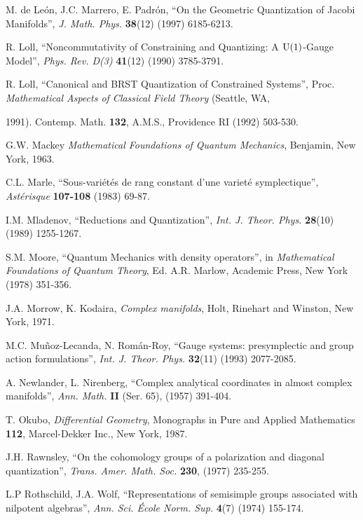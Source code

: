 \documentclass[12pt]{article}
\begin{document}
\begin{thebibliography}{55}
{\sc M. de Le\'on, J.C. Marrero, E. Padr\'on},
``On the Geometric Quantization of Jacobi Manifolds'',
{\it J. Math. Phys.} {\bf 38}(12) (1997) 6185-6213.

{\sc R. Loll},
``Noncommutativity of Constraining and Quantizing: A ${\rm U}(1)$-Gauge
Model'',
{\it Phys. Rev. D(3)} {\bf 41}(12) (1990) 3785-3791.

{\sc R. Loll},
``Canonical and BRST Quantization of Constrained Systems'',
Proc. {\it Mathematical Aspects of Classical Field Theory} (Seattle, WA,

1991).
Contemp. Math. {\bf 132}, A.M.S., Providence RI (1992) 503-530.

{\sc G.W. Mackey}
{\it Mathematical Foundations of Quantum Mechanics},
Benjamin, New York, 1963.

{\sc C.L. Marle},
``Sous-vari\'et\'es de rang constant d'une variet\'e symplectique'',
{\it Ast\'erisque} {\bf 107-108} (1983) 69-87.

{\sc I.M. Mladenov},
``Reductions and Quantization'',
{\it Int. J. Theor. Phys.} {\bf 28}(10) (1989) 1255-1267.

{\sc S.M. Moore},
``Quantum Mechanics with density operators'',
in {\it Mathematical Foundations of Quantum Theory},
Ed. A.R. Marlow, Academic Press, New York (1978) 351-356.

{\sc J.A. Morrow, K. Kodaira},
{\it Complex manifolds},
Holt, Rinehart and Winston, New York, 1971.

{\sc M.C. Mu\~noz-Lecanda, N. Rom\'an-Roy},
``Gauge systems: presymplectic and group action formulations'',
{\it Int. J. Theor. Phys.} {\bf 32}(11) (1993) 2077-2085.

{\sc A. Newlander, L. Nirenberg},
``Complex analytical coordinates in almost complex manifolds'',
{\it Ann. Math.} {\bf II} (Ser. 65),
(1957) 391-404.

{\sc T. Okubo},
{\it Differential Geometry},
Monographs in Pure and Applied Mathematics
{\bf 112}, Marcel-Dekker Inc., New York, 1987.

{\sc J.H. Rawnsley},
``On the cohomology groups of a polarization and diagonal
quantization'',
{\it Trans. Amer. Math. Soc.}
{\bf 230}, (1977) 235-255.

{\sc L.P Rothschild, J.A. Wolf},
``Representations of semisimple groups associated with nilpotent
algebras'',
{\it Ann. Sci. \'Ecole Norm. Sup.} {\bf 4}(7) (1974) 155-174.


\end{thebibliography}
\end{document}
